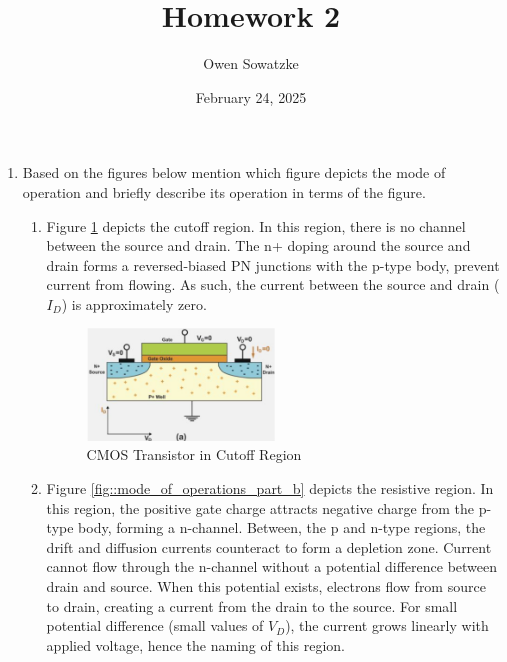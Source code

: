 \documentclass[fleqn]{article}
\title{Homework 2}
\author{Owen Sowatzke}
\date{February 24, 2025}
\newcommand{\zerodisplayskip}{
	\setlength{\abovedisplayskip}{0pt}%
	\setlength{\belowdisplayskip}{0pt}%
	\setlength{\abovedisplayshortskip}{0pt}%
	\setlength{\belowdisplayshortskip}{0pt}%
	\setlength{\mathindent}{0pt}}
\begin{document}
	\offinterlineskip
	\setlength{\lineskip}{12pt}
	\zerodisplayskip
	\maketitle
	
	\begin{enumerate}
		\item Based on the figures below mention which figure depicts the mode of operation and briefly describe its operation in terms of the figure.
		
		\begin{enumerate}
		
			\item Figure \ref{fig::mode_of_operations_part_a} depicts the cutoff region. In this region, there is no channel between the source and drain. The n+ doping around the source and drain forms a reversed-biased PN junctions with the p-type body, prevent current from flowing. As such, the current between the source and drain ($I_{D}$) is approximately zero.
			
			\begin{figure}[H]				
				\centerline{\includegraphics[width=0.5\textwidth]{mode_of_operations_part_a.png}}
				\caption{CMOS Transistor in Cutoff Region}
				\label{fig::mode_of_operations_part_a}
			\end{figure}
		
			\item Figure \ref{fig::mode_of_operations_part_b} depicts the resistive region. In this region, the positive gate charge attracts negative charge from the p-type body, forming a n-channel. Between, the p and n-type regions, the drift and diffusion currents counteract to form a depletion zone. Current cannot flow through the n-channel without a potential difference between drain and source. When this potential exists, electrons flow from source to drain, creating a current from the drain to the source. For small potential difference (small values of $V_D$), the current grows linearly with applied voltage, hence the naming of this region.
			

\end{enumerate}
\end{enumerate}
\end{document}
